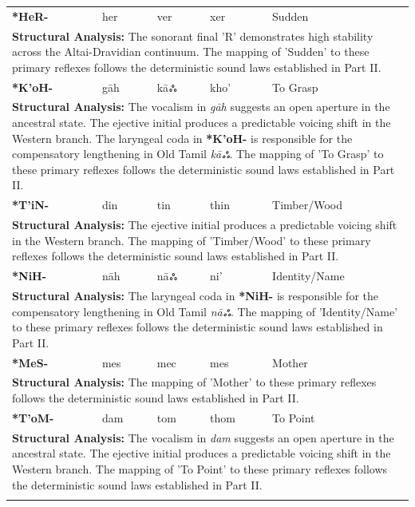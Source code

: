 \begin{longtable}{p{} p{} p{} p{} p{}}
\textbf{*HeR-} & her & ver & xer & Sudden \\ 
\multicolumn{5}{p{\textwidth}}{\small \textbf{Structural Analysis:} The sonorant final 'R' demonstrates high stability across the Altai-Dravidian continuum. The mapping of 'Sudden' to these primary reflexes follows the deterministic sound laws established in Part II.} \\ \addlinespace[15pt] 
\textbf{*K'oH-} & gāh & kāஃ & kho' & To Grasp \\ 
\multicolumn{5}{p{\textwidth}}{\small \textbf{Structural Analysis:} The vocalism in \textit{gāh} suggests an open aperture in the ancestral state. The ejective initial produces a predictable voicing shift in the Western branch. The laryngeal coda in \textbf{*K'oH-} is responsible for the compensatory lengthening in Old Tamil \textit{kāஃ}. The mapping of 'To Grasp' to these primary reflexes follows the deterministic sound laws established in Part II.} \\ \addlinespace[15pt] 
\textbf{*T'iN-} & din & tin & thin & Timber/Wood \\ 
\multicolumn{5}{p{\textwidth}}{\small \textbf{Structural Analysis:} The ejective initial produces a predictable voicing shift in the Western branch. The mapping of 'Timber/Wood' to these primary reflexes follows the deterministic sound laws established in Part II.} \\ \addlinespace[15pt] 
\textbf{*NiH-} & nāh & nāஃ & ni' & Identity/Name \\ 
\multicolumn{5}{p{\textwidth}}{\small \textbf{Structural Analysis:} The laryngeal coda in \textbf{*NiH-} is responsible for the compensatory lengthening in Old Tamil \textit{nāஃ}. The mapping of 'Identity/Name' to these primary reflexes follows the deterministic sound laws established in Part II.} \\ \addlinespace[15pt] 
\textbf{*MeS-} & mes & mec & mes & Mother \\ 
\multicolumn{5}{p{\textwidth}}{\small \textbf{Structural Analysis:}  The mapping of 'Mother' to these primary reflexes follows the deterministic sound laws established in Part II.} \\ \addlinespace[15pt] 
\textbf{*T'oM-} & dam & tom & thom & To Point \\ 
\multicolumn{5}{p{\textwidth}}{\small \textbf{Structural Analysis:} The vocalism in \textit{dam} suggests an open aperture in the ancestral state. The ejective initial produces a predictable voicing shift in the Western branch. The mapping of 'To Point' to these primary reflexes follows the deterministic sound laws established in Part II.} \\ \addlinespace[15pt] 

\end{longtable}
